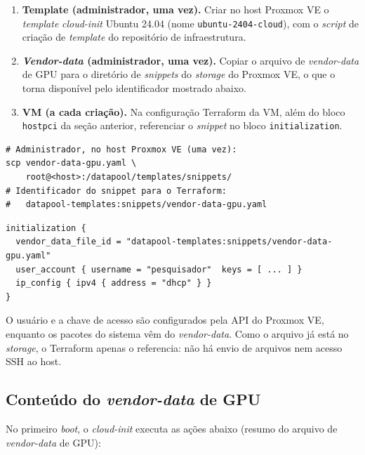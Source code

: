 \begin{enumerate}
    \item \textbf{Template (administrador, uma vez).} Criar no host Proxmox VE o \textit{template} \textit{cloud-init} Ubuntu 24.04 (nome \texttt{ubuntu-2404-cloud}), com o \textit{script} de criação de \textit{template} do repositório de infraestrutura.
    \item \textbf{\textit{Vendor-data} (administrador, uma vez).} Copiar o arquivo de \textit{vendor-data} de GPU para o diretório de \textit{snippets} do \textit{storage} do Proxmox VE, o que o torna disponível pelo identificador mostrado abaixo.
    \item \textbf{VM (a cada criação).} Na configuração Terraform da VM, além do bloco \texttt{hostpci} da seção anterior, referenciar o \textit{snippet} no bloco \texttt{initialization}.
\end{enumerate}

\medskip
\noindent\begin{minipage}{\textwidth}
\footnotesize
\begin{verbatim}
# Administrador, no host Proxmox VE (uma vez):
scp vendor-data-gpu.yaml \
    root@<host>:/datapool/templates/snippets/
# Identificador do snippet para o Terraform:
#   datapool-templates:snippets/vendor-data-gpu.yaml
\end{verbatim}
\end{minipage}
\medskip

\medskip
\noindent\begin{minipage}{\textwidth}
\footnotesize
\begin{verbatim}
initialization {
  vendor_data_file_id = "datapool-templates:snippets/vendor-data-gpu.yaml"
  user_account { username = "pesquisador"  keys = [ ... ] }
  ip_config { ipv4 { address = "dhcp" } }
}
\end{verbatim}
\end{minipage}
\medskip

O usuário e a chave de acesso são configurados pela API do Proxmox VE, enquanto os pacotes do sistema vêm do \textit{vendor-data}. Como o arquivo já está no \textit{storage}, o Terraform apenas o referencia: não há envio de arquivos nem acesso SSH ao host.

\subsection{Conteúdo do \textit{vendor-data} de GPU}

No primeiro \textit{boot}, o \textit{cloud-init} executa as ações abaixo (resumo do arquivo de \textit{vendor-data} de GPU):

